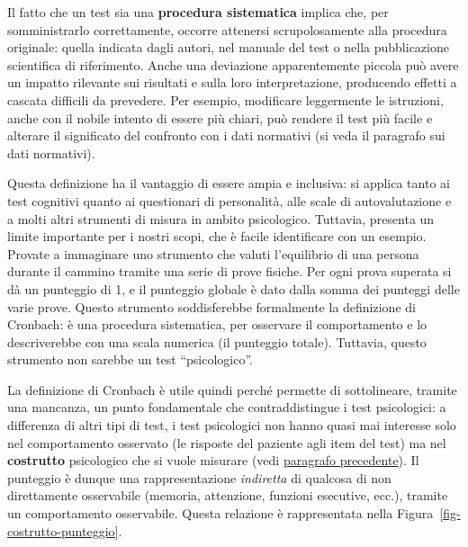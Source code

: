 \documentclass[
  italian,
  letterpaper,
  paper=A4,
  headinclude=on,
  footinclude=on,
  12pt]{scrbook}
\begin{document}
\begin{tcolorbox}[enhanced jigsaw, left=2mm, colbacktitle=quarto-callout-important-color!10!white, bottomrule=.15mm, opacityback=0, coltitle=black, colframe=quarto-callout-important-color-frame, opacitybacktitle=0.6, leftrule=.75mm, colback=white, toprule=.15mm, title=\textcolor{quarto-callout-important-color}{\faExclamation}\hspace{0.5em}{Nota}, titlerule=0mm, arc=.35mm, breakable, rightrule=.15mm, bottomtitle=1mm, toptitle=1mm]

Il fatto che un test sia una \textbf{procedura sistematica} implica che,
per somministrarlo correttamente, occorre attenersi scrupolosamente alla
procedura originale: quella indicata dagli autori, nel manuale del test
o nella pubblicazione scientifica di riferimento. Anche una deviazione
apparentemente piccola può avere un impatto rilevante sui risultati e
sulla loro interpretazione, producendo effetti a cascata difficili da
prevedere. Per esempio, modificare leggermente le istruzioni, anche con
il nobile intento di essere più chiari, può rendere il test più facile e
alterare il significato del confronto con i dati normativi (si veda il
paragrafo sui dati normativi).

\end{tcolorbox}

Questa definizione ha il vantaggio di essere ampia e inclusiva: si
applica tanto ai test cognitivi quanto ai questionari di personalità,
alle scale di autovalutazione e a molti altri strumenti di misura in
ambito psicologico. Tuttavia, presenta un limite importante per i nostri
scopi, che è facile identificare con un esempio. Provate a immaginare
uno strumento che valuti l'equilibrio di una persona durante il cammino
tramite una serie di prove fisiche. Per ogni prova superata si dà un
punteggio di 1, e il punteggio globale è dato dalla somma dei punteggi
delle varie prove. Questo strumento soddisferebbe formalmente la
definizione di Cronbach: è una procedura sistematica, per osservare il
comportamento e lo descriverebbe con una scala numerica (il punteggio
totale). Tuttavia, questo strumento non sarebbe un test ``psicologico''.

La definizione di Cronbach è utile quindi perché permette di
sottolineare, tramite una mancanza, un punto fondamentale che
contraddistingue i test psicologici: a differenza di altri tipi di test,
i test psicologici non hanno quasi mai interesse solo nel comportamento
osservato (le risposte del paziente agli item del test) ma nel
\textbf{costrutto} psicologico che si vuole misurare (vedi
\hyperref[cosa-misuriamo-in-neuropsicologia-clinica]{paragrafo
precedente}). Il punteggio è dunque una rappresentazione
\emph{indiretta} di qualcosa di non direttamente osservabile (memoria,
attenzione, funzioni esecutive, ecc.), tramite un comportamento
osservabile. Questa relazione è rappresentata nella
Figura~\ref{fig-costrutto-punteggio}.
\end{document}
